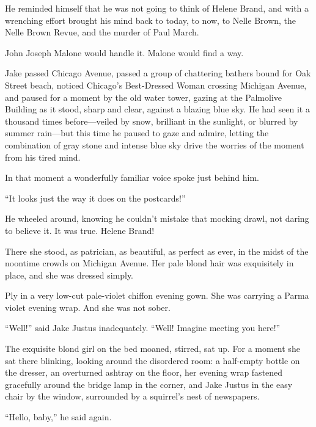 \documentclass{novel}
\begin{document}
He reminded himself that he was not going to think of Helene Brand, and with a wrenching effort brought his mind back to today, to now, to Nelle Brown, the Nelle Brown Revue, and the murder of Paul March.

John Joseph Malone would handle it. Malone would find a way.

Jake passed Chicago Avenue, passed a group of chattering bathers bound for Oak Street beach, noticed Chicago’s Best-Dressed Woman crossing Michigan Avenue, and paused for a moment by the old water tower, gazing at the Palmolive Building as it stood, sharp and clear, against a blazing blue sky. He had seen it a thousand times before—veiled by snow, brilliant in the sunlight, or blurred by summer rain—but this time he paused to gaze and admire, letting the combination of gray stone and intense blue sky drive the worries of the moment from his tired mind.

In that moment a wonderfully familiar voice spoke just behind him.

“It looks just the way it does on the postcards!”

He wheeled around, knowing he couldn’t mistake that mocking drawl, not daring to believe it. It was true. Helene Brand!

There she stood, as patrician, as beautiful, as perfect as ever, in the midst of the noontime crowds on Michigan Avenue. Her pale blond hair was exquisitely in place, and she was dressed simply.

Ply in a very low-cut pale-violet chiffon evening gown. She was carrying a Parma violet evening wrap. And she was not sober.

“Well!” said Jake Justus inadequately. “Well! Imagine meeting you here!”

\begin{ChapterStart}
\vspace{3\nbs}
\end{ChapterStart}

The exquisite blond girl on the bed moaned, stirred, sat up. For a moment she sat there blinking, looking around the disordered room: a half-empty bottle on the dresser, an overturned ashtray on the floor, her evening wrap fastened gracefully around the bridge lamp in the corner, and Jake Justus in the easy chair by the window, surrounded by a squirrel’s nest of newspapers.

“Hello, baby,” he said again.
\end{document}
